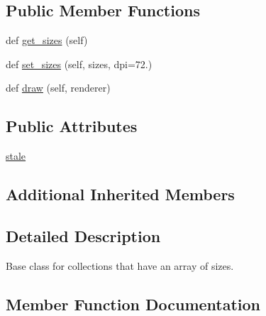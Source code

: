 \subsection*{Public Member Functions}
\begin{DoxyCompactItemize}
\item 
def \hyperlink{classmatplotlib_1_1collections_1_1__CollectionWithSizes_a60026a6cc1f2c409149b7007d3beecd5}{get\+\_\+sizes} (self)
\item 
def \hyperlink{classmatplotlib_1_1collections_1_1__CollectionWithSizes_afd9670079ab9e271580a408af9445828}{set\+\_\+sizes} (self, sizes, dpi=72.)
\item 
def \hyperlink{classmatplotlib_1_1collections_1_1__CollectionWithSizes_ad8b91e88cf0807bb683743caadbe4fe2}{draw} (self, renderer)
\end{DoxyCompactItemize}
\subsection*{Public Attributes}
\begin{DoxyCompactItemize}
\item 
\hyperlink{classmatplotlib_1_1collections_1_1__CollectionWithSizes_acf59e05783a5ebb605d18256e92bb4f5}{stale}
\end{DoxyCompactItemize}
\subsection*{Additional Inherited Members}


\subsection{Detailed Description}
\begin{DoxyVerb}Base class for collections that have an array of sizes.
\end{DoxyVerb}
 

\subsection{Member Function Documentation}
\mbox{\label{classmatplotlib_1_1collections_1_1__CollectionWithSizes_ad8b91e88cf0807bb683743caadbe4fe2}} 
